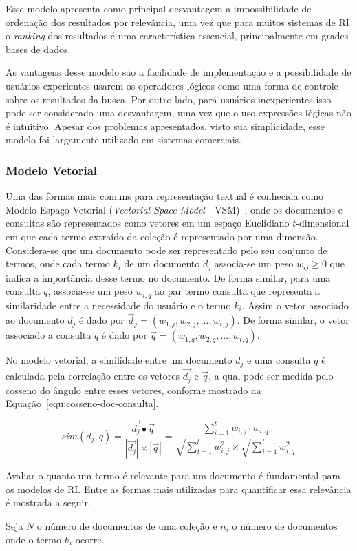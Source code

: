 Esse modelo apresenta como principal desvantagem a impossibilidade de ordenação dos resultados por relevância, uma vez que para muitos sistemas de RI o \textit{ranking} dos resultados é uma característica essencial, principalmente em grades bases de dados. 

As vantagens desse modelo são a facilidade de implementação e a possibilidade de usuários experientes usarem os operadores lógicos como uma forma de controle sobre os resultados da busca. Por outro lado, para usuários inexperientes isso pode ser considerado uma desvantagem, uma vez que o uso expressões lógicas não é intuitivo. Apesar dos problemas apresentados, visto sua simplicidade, esse modelo foi largamente utilizado em sistemas comerciais. 



\subsubsection{Modelo Vetorial}


Uma das formas mais comuns para representação textual é conhecida como Modelo Espaço Vetorial (\textit{Vectorial Space Model} - VSM)~\cite{Rezende2003}, onde os documentos e consultas são representados como vetores em um espaço Euclidiano $t$-dimensional em que cada termo extraído da coleção é representado por uma dimensão. 
% 
Considera-se que um documento pode ser representado pelo seu conjunto de termos, onde cada termo $k_i$ de um documento $d_j$ associa-se um peso $w_{ij}\geq0$ que indica a importância desse termo no documento. 
%
De forma similar, para uma consulta $q$, associa-se um peso $w_{i,q}$ ao par termo consulta que representa a similaridade entre a necessidade do usuário e o termo $k_i$. 
%
Assim o vetor associado ao documento $d_j$ é dado por $\vec{d}_{j} = (w_{1,j}, w_{2,j}, ..., w_{t,j})$. 
%
De forma similar, o vetor associado a consulta $q$ é dado por $\vec{q} = (w_{1,q}, w_{2,q}, ..., w_{t,q})$.


No modelo vetorial, a similidade entre um documento $d_j$ e uma consulta $q$ é calculada pela correlação entre os vetores $\vec{d_j}$ e $\vec{q}$, a qual pode ser medida pelo cosseno do  ângulo entre esses vetores, conforme mostrado na Equação~\ref{equ:cosseno-doc-consulta}.



\begin{equation}
sim(d_j, q) = \frac{ \vec{d_j} \bullet \vec{q} }
                   { |\vec{d_j}| \times | \vec{q}|}
            = \frac{ \sum_{i=1}^{t} w_{i,j} \cdot w_{i,q} }
                   { \sqrt{\sum_{i=1}^{t} w_{i,j}^2} \times \sqrt{\sum_{i=1}^{t} w_{i,q}^2 } }                   \label{equ:cosseno-doc-consulta}		                   
\end{equation} 



Avaliar o quanto um termo é relevante para um documento é fundamental para os modelos de RI. Entre as formas mais utilizadas para quantificar essa relevância é mostrada a seguir. 

Seja $N$ o número de documentos de uma coleção e $n_i$ o número de documentos onde o termo $k_i$ ocorre. 

